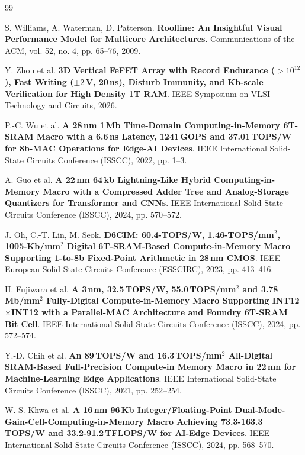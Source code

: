 \documentclass[11pt, a4paper]{ctexart}
\let\emph\textbf
\theoremstyle{definition}
\begin{document}
\begin{thebibliography}{99}

S. Williams, A. Waterman, D. Patterson.
\emph{Roofline: An Insightful Visual Performance Model for Multicore Architectures}.
Communications of the ACM, vol. 52, no. 4, pp. 65--76, 2009.

Y. Zhou et al.
\emph{3D Vertical FeFET Array with Record Endurance ($>10^{12}$), Fast Writing ($\pm 2$\,V, 20\,ns), Disturb Immunity, and Kb-scale Verification for High Density 1T RAM}.
IEEE Symposium on VLSI Technology and Circuits, 2026.

P.-C. Wu et al.
\emph{A 28\,nm 1\,Mb Time-Domain Computing-in-Memory 6T-SRAM Macro with a 6.6\,ns Latency, 1241\,GOPS and 37.01\,TOPS/W for 8b-MAC Operations for Edge-AI Devices}.
IEEE International Solid-State Circuits Conference (ISSCC), 2022, pp. 1--3.

A. Guo et al.
\emph{A 22\,nm 64\,kb Lightning-Like Hybrid Computing-in-Memory Macro with a Compressed Adder Tree and Analog-Storage Quantizers for Transformer and CNNs}.
IEEE International Solid-State Circuits Conference (ISSCC), 2024, pp. 570--572.

J. Oh, C.-T. Lin, M. Seok.
\emph{D6CIM: 60.4-TOPS/W, 1.46-TOPS/mm${}^2$, 1005-Kb/mm${}^2$ Digital 6T-SRAM-Based Compute-in-Memory Macro Supporting 1-to-8b Fixed-Point Arithmetic in 28\,nm CMOS}.
IEEE European Solid-State Circuits Conference (ESSCIRC), 2023, pp. 413--416.

H. Fujiwara et al.
\emph{A 3\,nm, 32.5\,TOPS/W, 55.0\,TOPS/mm${}^2$ and 3.78\,Mb/mm${}^2$ Fully-Digital Compute-in-Memory Macro Supporting INT12$\times$INT12 with a Parallel-MAC Architecture and Foundry 6T-SRAM Bit Cell}.
IEEE International Solid-State Circuits Conference (ISSCC), 2024, pp. 572--574.

Y.-D. Chih et al.
\emph{An 89\,TOPS/W and 16.3\,TOPS/mm${}^2$ All-Digital SRAM-Based Full-Precision Compute-in Memory Macro in 22\,nm for Machine-Learning Edge Applications}.
IEEE International Solid-State Circuits Conference (ISSCC), 2021, pp. 252--254.

W.-S. Khwa et al.
\emph{A 16\,nm 96\,Kb Integer/Floating-Point Dual-Mode-Gain-Cell-Computing-in-Memory Macro Achieving 73.3-163.3\,TOPS/W and 33.2-91.2\,TFLOPS/W for AI-Edge Devices}.
IEEE International Solid-State Circuits Conference (ISSCC), 2024, pp. 568--570.


\end{thebibliography}
\end{document}
